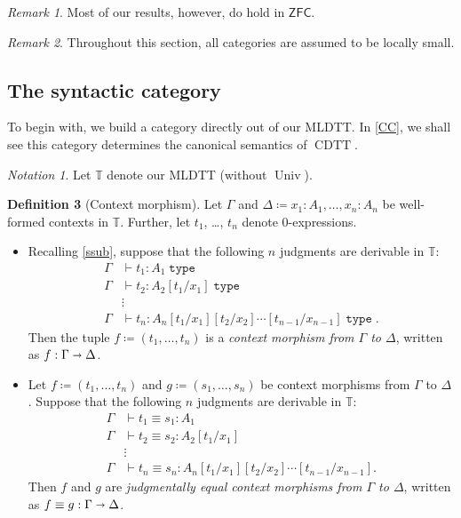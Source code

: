 \documentclass[10pt,letterpaper,cm]{nupset}
\theoremstyle{definition}
\newtheorem{definition}{Definition}[subsection]
\theoremstyle{theorem}
\theoremstyle{remark}
\newtheorem{remark}[definition]{Remark}
\newtheorem*{notation}{Notation}
\newcommand{\sra}{\shortrightarrow}
\newcommand{\0}{\mathbf{0}}
\newcommand{\1}{\mathbf{1}}
\newcommand{\2}{\mathbf{2}}
\DeclareMathOperator{\type}{\mathtt{type}}
\DeclareMathOperator{\cdtt}{\mathrm{CDTT}}
\DeclareMathOperator{\univ}{\mathrm{Univ}}
\newcommand{\T}{\mathbb T}
\newcommand{\bi}{\begin{itemize}}
\newcommand{\ei}{\end{itemize}}
\begin{document}
\begin{remark}
Most of our results, however, do hold in $\mathsf{ZFC}$.
\end{remark}

\smallskip

\begin{remark}
Throughout this section, all categories are assumed to be locally small. 
\end{remark}

\subsection{The syntactic category}

To begin with,  we build a category directly out of our MLDTT. In \cref{CC}, we shall see  this category determines the canonical semantics of $\cdtt$.  

\begin{notation}
Let $\T$ denote our MLDTT (without $\univ$).
\end{notation}

\begin{definition}[Context morphism]
Let $\Gamma$ and $\Delta \coloneqq {x_1 :A_1, \ldots, x_n :A_n}$ be well-formed contexts in $\T$. Further, let $t_1$, \ldots, $t_n$ denote $0$-expressions.
\bi
\item Recalling \cref{ssub}, suppose that the following $n$ judgments are derivable in $\T$:
\begin{align*}
\Gamma & \vdash t_1 : A_1 \type
\\ \Gamma & \vdash t_2 : A_2[t_1/x_1] \type
\\ & \vdots
\\ \Gamma & \vdash  t_n : A_n[t_1/x_1][t_2/x_2]\cdots[t_{n-1}/x_{n-1}] \type.
\end{align*}
Then the tuple $f\coloneqq \left(t_1, \ldots, t_n \right)$ is a \textit{context morphism from $\Gamma$ to $\Delta$}, written as $f : \Gamma \sra \Delta$.
\item Let $f \coloneqq \left(t_1, \ldots, t_n \right)$ and $g\coloneqq \left(s_1, \ldots, s_n \right)$ be context morphisms from $\Gamma$ to $\Delta$. Suppose that the following $n$ judgments are derivable in $\T$:
\begin{align*}
\Gamma & \vdash t_1 \equiv s_1 : A_1 
\\ \Gamma & \vdash t_2 \equiv s_2 : A_2[t_1/x_1]
\\ & \vdots
\\ \Gamma & \vdash  t_n\equiv s_n : A_n[t_1/x_1][t_2/x_2]\cdots[t_{n-1}/x_{n-1}] .
\end{align*}
Then $f$ and $g$ are \textit{judgmentally equal context morphisms from $\Gamma$ to $\Delta$}, written as \linebreak $f \equiv g :  \Gamma \sra \Delta$.
\ei 
\end{definition}
\end{document}
